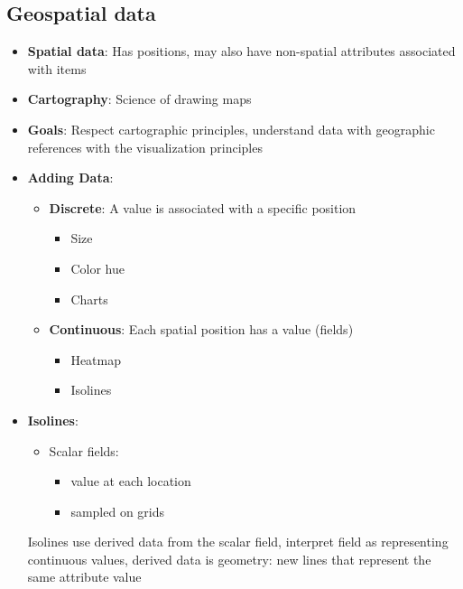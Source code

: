 \documentclass{report}
\begin{document}
    \subsection{Geospatial data}
    \begin{itemize}
        \item \textbf{Spatial data}: Has positions, may also have non-spatial attributes associated with items
        \item \textbf{Cartography}: Science of drawing maps
        \item \textbf{Goals}: Respect cartographic principles, understand data with geographic references with the visualization principles
        \item \textbf{Adding Data}: 
            \begin{itemize}
                \item \textbf{Discrete}: A value is associated with a specific position
                    \begin{itemize}
                        \item Size
                        \item Color hue
                        \item Charts
                    \end{itemize}
                \item \textbf{Continuous}:  Each spatial position has a value (fields)
                    \begin{itemize}
                        \item Heatmap
                        \item Isolines
                    \end{itemize}
            \end{itemize}
        \item \textbf{Isolines}: 
            \begin{itemize}
                \item Scalar fields:
                \begin{itemize}
                    \item value at each location
                    \item sampled on grids
                \end{itemize}
            \end{itemize}
            Isolines use derived data from the scalar field, interpret field as representing continuous values, derived data is geometry: new lines that represent the same attribute value

\end{itemize}
\end{document}

